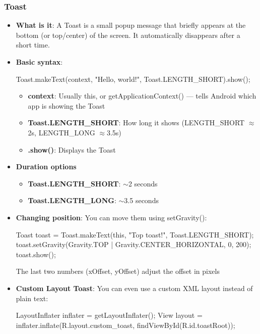\documentclass{report}
\begin{document}
    \pagebreak 
    \subsubsection{Toast}
    \begin{itemize}
        \item \textbf{What is it}: A Toast is a small popup message that briefly appears at the bottom (or top/center) of the screen. It automatically disappears after a short time. 
        \item \textbf{Basic syntax}:
            \bigbreak \noindent 
            \begin{javacode}
                Toast.makeText(context, "Hello, world!", Toast.LENGTH_SHORT).show();
            \end{javacode}
            \begin{itemize}
                \item \textbf{context}:	Usually this, or getApplicationContext() — tells Android which app is showing the Toast
                \item \textbf{Toast.LENGTH\_SHORT}:	How long it shows (LENGTH\_SHORT $\approx$ 2s, LENGTH\_LONG $\approx$3.5s)
                \item \textbf{.show()}:	Displays the Toast
            \end{itemize}
        \item \textbf{Duration options}
            \begin{itemize}
                \item \textbf{Toast.LENGTH\_SHORT}:	$\sim$2 seconds
                \item \textbf{Toast.LENGTH\_LONG}:	$\sim$3.5 seconds
            \end{itemize}
        \item \textbf{Changing position}: You can move them using setGravity():
            \bigbreak \noindent 
            \begin{javacode}
            Toast toast = Toast.makeText(this, "Top toast!", Toast.LENGTH_SHORT);
            toast.setGravity(Gravity.TOP | Gravity.CENTER_HORIZONTAL, 0, 200);
            toast.show();
            \end{javacode}
            \bigbreak \noindent 
            The last two numbers (xOffset, yOffset) adjust the offset in pixels
        \item \textbf{Custom Layout Toast}: You can even use a custom XML layout instead of plain text:
            \bigbreak \noindent 
            \begin{javacode}
                LayoutInflater inflater = getLayoutInflater();
                View layout = inflater.inflate(R.layout.custom_toast, findViewById(R.id.toastRoot));


\end{javacode}
\end{itemize}
\end{document}

